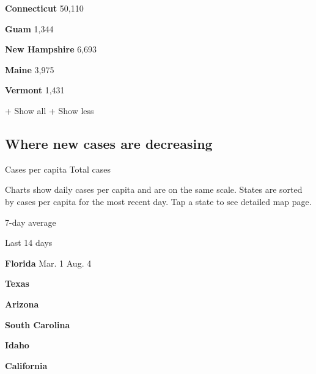 \textbf{Connecticut} 50,110

\textbf{Guam} 1,344

\href{https://www.nytimes.com/interactive/2020/us/new-hampshire-coronavirus-cases.html}{}

\textbf{New Hampshire} 6,693

\href{https://www.nytimes.com/interactive/2020/us/maine-coronavirus-cases.html}{}

\textbf{Maine} 3,975

\href{https://www.nytimes.com/interactive/2020/us/vermont-coronavirus-cases.html}{}

\textbf{Vermont} 1,431

+ Show all + Show less

\hypertarget{where-new-cases-are-decreasing}{%
\subsection{Where new cases are
decreasing}\label{where-new-cases-are-decreasing}}

Cases per capita Total cases

Charts show daily cases per capita and are on the same scale. States are
sorted by cases per capita for the most recent day. Tap a state to see
detailed map page.

\href{https://www.nytimes.com/interactive/2020/us/florida-coronavirus-cases.html}{}

7-day average

Last 14 days

\textbf{Florida} Mar. 1 Aug. 4

\href{https://www.nytimes.com/interactive/2020/us/texas-coronavirus-cases.html}{}

\textbf{Texas}

\href{https://www.nytimes.com/interactive/2020/us/arizona-coronavirus-cases.html}{}

\textbf{Arizona}

\href{https://www.nytimes.com/interactive/2020/us/south-carolina-coronavirus-cases.html}{}

\textbf{South Carolina}

\href{https://www.nytimes.com/interactive/2020/us/idaho-coronavirus-cases.html}{}

\textbf{Idaho}

\href{https://www.nytimes.com/interactive/2020/us/california-coronavirus-cases.html}{}

\textbf{California}

